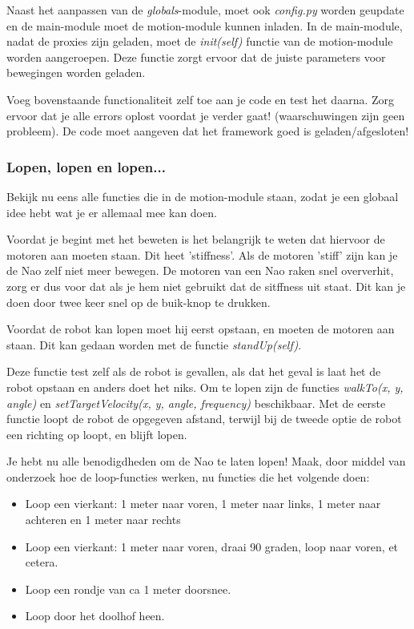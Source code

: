\documentclass[a4paper]{article}
\begin{document}
Naast het aanpassen van de \textit{globals}-module, moet ook \textit{config.py} worden geupdate en de main-module moet de motion-module kunnen inladen.
In de main-module, nadat de proxies zijn geladen, moet de \textit{init(self)} functie van de motion-module worden aangeroepen. Deze functie zorgt ervoor dat de juiste parameters voor bewegingen worden geladen.

Voeg bovenstaande functionaliteit zelf toe aan je code en test het daarna. Zorg ervoor dat je alle errors oplost voordat je verder gaat! (waarschuwingen zijn geen probleem). De code moet aangeven dat het framework goed is geladen/afgesloten!

\subsubsection{Lopen, lopen en lopen...}
Bekijk nu eens alle functies die in de motion-module staan, zodat je een globaal idee hebt wat je er allemaal mee kan doen.

Voordat je begint met het beweten is het belangrijk te weten dat hiervoor de motoren aan moeten staan. Dit heet 'stiffness'. Als de motoren 'stiff' zijn kan je de Nao zelf niet meer bewegen. De motoren van een Nao raken snel oververhit, zorg er dus voor dat als je hem niet gebruikt dat de sitffness uit staat. Dit kan je doen door twee keer snel op de buik-knop te drukken.

Voordat de robot kan lopen moet hij eerst opstaan, en moeten de motoren aan staan. Dit kan gedaan worden met de functie \textit{standUp(self)}.

Deze functie test zelf als de robot is gevallen, als dat het geval is laat het de robot opstaan en anders doet het niks.
Om te lopen zijn de functies \textit{walkTo(x, y, angle)} en \textit{setTargetVelocity(x, y, angle, frequency)} beschikbaar.
Met de eerste functie loopt de robot de opgegeven afstand, terwijl bij de tweede optie de robot een richting op loopt, en blijft lopen.

Je hebt nu alle benodigdheden om de Nao te laten lopen! Maak, door middel van onderzoek hoe de loop-functies werken, nu functies die het volgende doen:
\begin{itemize}
\item Loop een vierkant: 1 meter naar voren, 1 meter naar links, 1 meter naar achteren en 1 meter naar rechts
\item Loop een vierkant: 1 meter naar voren, draai 90 graden, loop naar voren, et cetera.
\item Loop een rondje van ca 1 meter doorsnee.
\item Loop door het doolhof heen.
\end{itemize}
\end{document}

